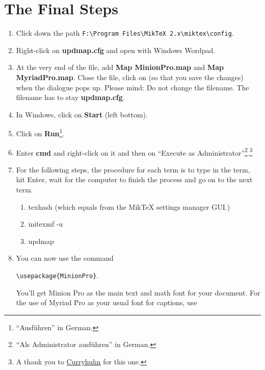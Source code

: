 \section{The Final Steps}

\begin{enumerate}
	\item Click down the path \verb+F:\Program Files\MikTeX 2.x\miktex\config+.
	\item Right-click on \textbf{updmap.cfg} and open with Windows Wordpad.
	\item At the very end of the file, add \textbf{Map MinionPro.map} and \textbf{Map MyriadPro.map}. Close the file, click on  (so that you save the changes) when the dialogue pops up. Please mind: Do not change the filename. The filename has to stay \textbf{updmap.cfg}.
	\item In Windows, click on \textbf{Start} (left bottom).
	\item Click on \textbf{Run}\footnote{``Ausführen'' in German.}.
	\item Enter \textbf{cmd} and right-click on it and then on ``Execute as Administrator''\footnote{``Als Administrator ausführen'' in German.}.\footnote{A  thank you to \href{http://www.typografie.info/3/topic/25089-schriftart-festlegen/\#entry132082}{Curryhuhn} for this one.}
	\item For the following steps, the procedure for each term is to type in the term, hit Enter, wait for the computer to finish the process and go on to the next term.
	\begin{enumerate}
		\item texhash (which equals  from the MikTeX settings manager GUI.)
		\item initexmf -u
		\item updmap
	\end{enumerate}
	\item You can now use the command
	\begin{center}\begin{minipage}[t]{8cm}
	\begin{flushleft}
	\verb+\usepackage{MinionPro}+.
	\end{flushleft}
	\end{minipage}\end{center}
	You'll get Minion Pro as the main text and math font for your document. For the use of Myriad Pro as your usual font for captions, use
	\begin{center}\begin{minipage}[t]{8cm}

\end{minipage}
\end{center}
\end{enumerate}
